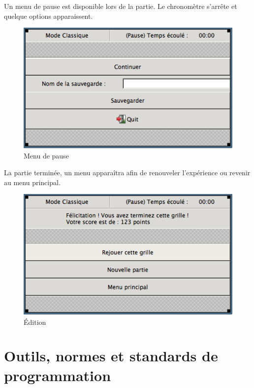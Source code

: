 \documentclass[11pt]{article}
\begin{document}
	\FloatBarrier
	
	Un menu de pause est disponible lors de la partie. Le chronomètre s'arrête et quelque options apparaissent.
	
		\begin{figure}[!ht]
			\centering
			\includegraphics[]{./IHM/pause.png}
			\caption{Menu de pause}
		\end{figure}
		
	\FloatBarrier
		
	La partie terminée, un menu apparaîtra afin de renouveler l'expérience ou revenir au menu principal.
	
		\begin{figure}[!ht]
			\centering
			\includegraphics[]{./IHM/fin_partie.png}
			\caption{Édition}
		\end{figure}
		
	\FloatBarrier
%

\newpage

\section{Outils, normes et standards de programmation}
\end{document}
